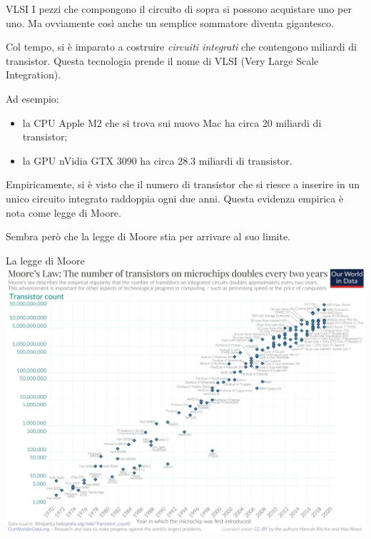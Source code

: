 \documentclass[aspectratio=169,10pt,dvipsnames,xcolor=table,handout]{beamer}
\begin{document}
\begin{frame}{VLSI}
    I pezzi che compongono il circuito di sopra si possono acquistare uno per uno. Ma ovviamente così anche un semplice sommatore diventa gigantesco.

    \medskip
    Col tempo, si è imparato a costruire \emph{circuiti integrati} che contengono miliardi di transistor. Questa tecnologia prende il nome di \alert{VLSI} (Very Large Scale Integration).

    \medskip
    Ad esempio:
    \begin{itemize}
        \item la CPU Apple M2 che si trova sui nuovo Mac ha circa 20 miliardi di transistor;
        \item la GPU nVidia GTX 3090 ha circa 28.3 miliardi di transistor.
    \end{itemize}

    \medskip
    Empiricamente, si è visto che il numero di transistor che si riesce a inserire in un unico circuito integrato raddoppia ogni due anni. Questa evidenza empirica è nota come \alert{legge di Moore}.

    \medskip
    Sembra però che la legge di Moore stia per arrivare al suo limite.
\end{frame}

\begin{frame}{La legge di Moore}
    \centering
    \includegraphics[height=0.95\textheight]{Moore's_Law_Transistor_Count_1970-2020.png}
\end{frame}
\end{document}
